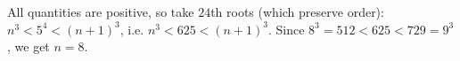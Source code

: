 All quantities are positive, so take $24$th roots (which preserve order): $n^3<5^4<(n+1)^3$, i.e. $n^3<625<(n+1)^3$. Since $8^3=512<625<729=9^3$, we get $n=\boxed{8}$.
